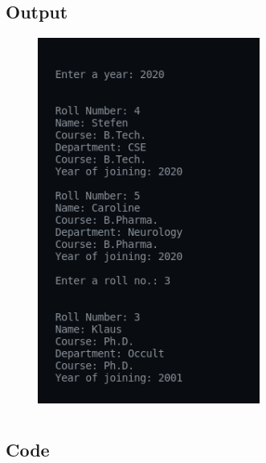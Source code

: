 \documentclass[12pt]{article}
\begin{document}
\subsection{Output}
\begin{figure}[h]
    \centering
    \includegraphics[width=0.65\textwidth]{3.png}
\end{figure}

\newpage
\section{}
\subsection{Code}
\inputminted{c}{q4.c}
\newpage
\end{document}
